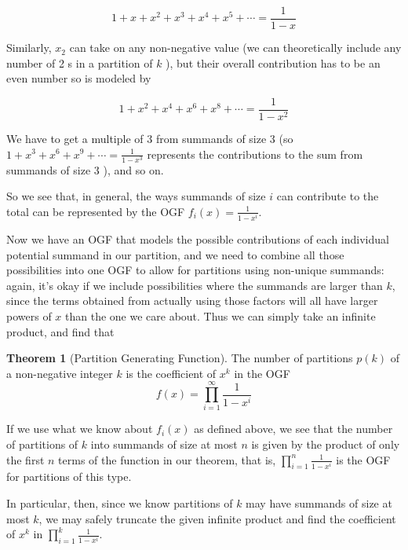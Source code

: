 \documentclass{article}
\theoremstyle{definition}
\newtheorem{theorem}{Theorem}
\begin{document}
$$
1+x+x^{2}+x^{3}+x^{4}+x^{5}+\cdots=\frac{1}{1-x}
$$

Similarly, $x_{2}$ can take on any non-negative value (we can theoretically include any number of 2 s in a partition of $k$ ), but their overall contribution has to be an even number so is modeled by

$$
1+x^{2}+x^{4}+x^{6}+x^{8}+\cdots=\frac{1}{1-x^{2}}
$$

We have to get a multiple of 3 from summands of size 3 (so $1+x^{3}+x^{6}+x^{9}+\cdots=\frac{1}{1-x^{3}}$ represents the contributions to the sum from summands of size 3 ), and so on.

So we see that, in general, the ways summands of size $i$ can contribute to the total can be represented by the OGF $f_{i}(x)=\frac{1}{1-x^{i}}$.

Now we have an OGF that models the possible contributions of each individual potential summand in our partition, and we need to combine all those possibilities into one OGF to allow for partitions using non-unique summands: again, it's okay if we include possibilities where the summands are larger than $k$, since the terms obtained from actually using those factors will all have larger powers of $x$ than the one we care about. Thus we can simply take an infinite product, and find that

\begin{theorem}[Partition Generating Function]
The number of partitions $p(k)$ of a non-negative integer $k$ is the coefficient of $x^{k}$ in the OGF
\[f(x)=\prod_{i=1}^{\infty} \frac{1}{1-x^{i}}\]
\end{theorem}

If we use what we know about $f_{i}(x)$ as defined above, we see that the number of partitions of $k$ into summands of size at most $n$ is given by the product of only the first $n$ terms of the function in our theorem, that is, $\prod_{i=1}^{n} \frac{1}{1-x^{i}}$ is the OGF for partitions of this type.

In particular, then, since we know partitions of $k$ may have summands of size at most $k$, we may safely truncate the given infinite product and find the coefficient of $x^{k}$ in $\prod_{i=1}^{k} \frac{1}{1-x^{i}}$.













\newpage
\end{document}

